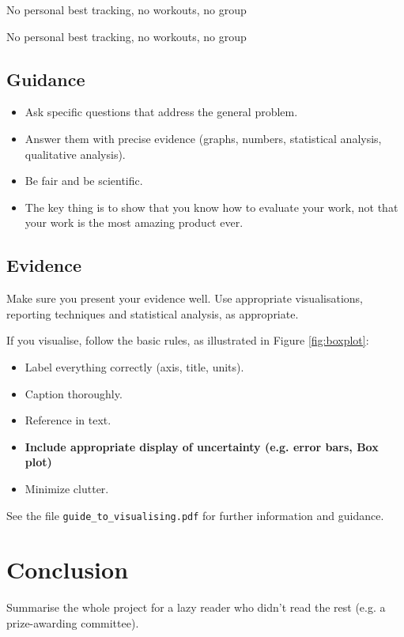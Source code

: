 \documentclass{l4proj}
\begin{document}
No personal best tracking, no workouts, no group

No personal best tracking, no workouts, no group


\section{Guidance}
\begin{itemize}
    \item
        Ask specific questions that address the general problem.
    \item
        Answer them with precise evidence (graphs, numbers, statistical
        analysis, qualitative analysis).
    \item
        Be fair and be scientific.
    \item
        The key thing is to show that you know how to evaluate your work, not
        that your work is the most amazing product ever.
\end{itemize}

\section{Evidence}
Make sure you present your evidence well. Use appropriate visualisations, reporting techniques and statistical analysis, as appropriate.

If you visualise, follow the basic rules, as illustrated in Figure \ref{fig:boxplot}:
\begin{itemize}
\item Label everything correctly (axis, title, units).
\item Caption thoroughly.
\item Reference in text.
\item \textbf{Include appropriate display of uncertainty (e.g. error bars, Box plot)}
\item Minimize clutter.
\end{itemize}

See the file \texttt{guide\_to\_visualising.pdf} for further information and guidance.



\chapter{Conclusion}    
Summarise the whole project for a lazy reader who didn't read the rest (e.g. a prize-awarding committee).
\end{document}
